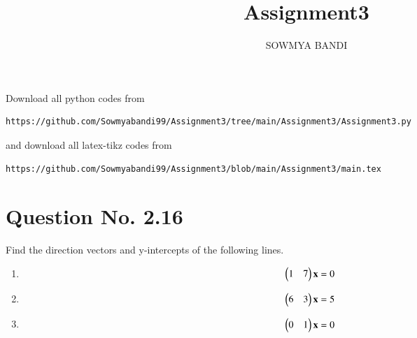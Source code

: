 \documentclass[journal,12pt,twocolumn]{IEEEtran}
\begin{document}
     \def\rightbox#1{\makebox[0in][r]{#1}}
     \def\centbox#1{\makebox[0in]{#1}}
     \def\topbox#1{\raisebox{-\baselineskip}[0in][0in]{#1}}
     \def\midbox#1{\raisebox{-0.5\baselineskip}[0in][0in]{#1}}
\vspace{3cm}
\title{Assignment3}
\author{SOWMYA BANDI}
\maketitle
\newpage
\bigskip
\renewcommand{\thefigure}{\theenumi}
\renewcommand{\thetable}{\theenumi}
Download all python codes from 
\begin{lstlisting}
https://github.com/Sowmyabandi99/Assignment3/tree/main/Assignment3/Assignment3.py
\end{lstlisting}
%
and download all latex-tikz codes from 
%
\begin{lstlisting}
https://github.com/Sowmyabandi99/Assignment3/blob/main/Assignment3/main.tex
\end{lstlisting}
%
\section{Question No. 2.16}
Find the direction vectors  and y-intercepts of the following lines.
\begin{enumerate}
\item
\begin{align}
\begin{split}
\begin{pmatrix}1 & 7\end{pmatrix}\mathbf{x}&=0  \label{eq1}
\end{split}
\end{align}
\item
\begin{align}
\begin{split}
\begin{pmatrix}6 & 3\end{pmatrix}\mathbf{x}&=5  \label{eq2}
\end{split}
\end{align}
\item
\begin{align}
\begin{split}
\begin{pmatrix}0 & 1\end{pmatrix}\mathbf{x}&=0  \label{eq3}
\end{split}
\end{align}
\end{enumerate}
%
\end{document}
